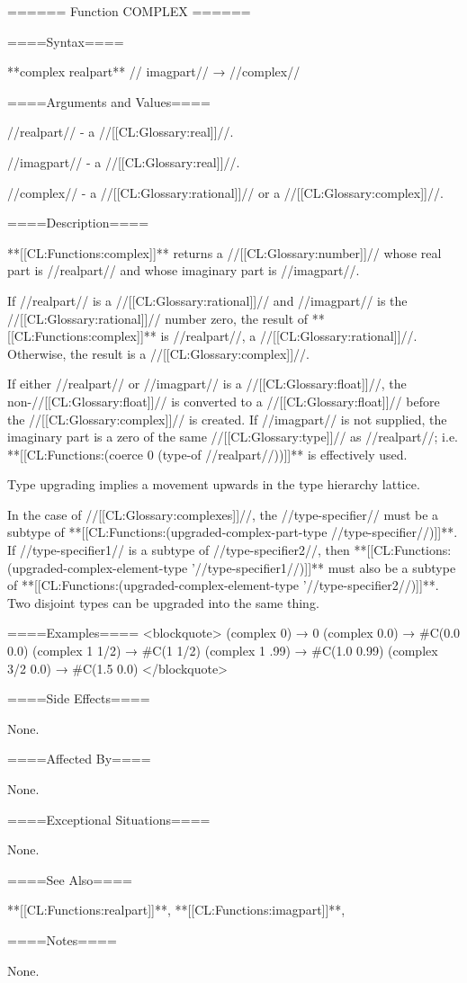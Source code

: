 ====== Function COMPLEX ======

====Syntax====

**complex {realpart** //\opt} imagpart// → //complex//

====Arguments and Values====

//realpart// - a //[[CL:Glossary:real]]//.

//imagpart// - a //[[CL:Glossary:real]]//.

//complex// - a //[[CL:Glossary:rational]]// or a //[[CL:Glossary:complex]]//.

====Description====

**[[CL:Functions:complex]]** returns a //[[CL:Glossary:number]]// whose real part is //realpart// and whose imaginary part is //imagpart//.

If //realpart// is a //[[CL:Glossary:rational]]// and //imagpart// is the //[[CL:Glossary:rational]]// number zero, the result of **[[CL:Functions:complex]]** is //realpart//, a //[[CL:Glossary:rational]]//. Otherwise, the result is a //[[CL:Glossary:complex]]//.

If either //realpart// or //imagpart// is a //[[CL:Glossary:float]]//, the non-//[[CL:Glossary:float]]// is converted to a //[[CL:Glossary:float]]// before the //[[CL:Glossary:complex]]// is created. If //imagpart// is not supplied, the imaginary part is a zero of the same //[[CL:Glossary:type]]// as //realpart//; i.e. **[[CL:Functions:(coerce 0 (type-of //realpart//))]]** is effectively used.

Type upgrading implies a movement upwards in the type hierarchy lattice.

In the case of //[[CL:Glossary:complexes]]//, the //type-specifier//  must be a subtype of **[[CL:Functions:(upgraded-complex-part-type //type-specifier//)]]**. If //type-specifier1// is a subtype of //type-specifier2//, then **[[CL:Functions:(upgraded-complex-element-type '//type-specifier1//)]]** must also be a subtype of **[[CL:Functions:(upgraded-complex-element-type '//type-specifier2//)]]**. Two disjoint types can be upgraded into the same thing.


====Examples==== <blockquote> (complex 0) → 0 (complex 0.0) → #C(0.0 0.0) (complex 1 1/2) → #C(1 1/2) (complex 1 .99) → #C(1.0 0.99) (complex 3/2 0.0) → #C(1.5 0.0) </blockquote>

====Side Effects====

None.

====Affected By====

None.

====Exceptional Situations====

None.

====See Also====

**[[CL:Functions:realpart]]**, **[[CL:Functions:imagpart]]**,

{\secref\SharpsignC}

====Notes====

None.

